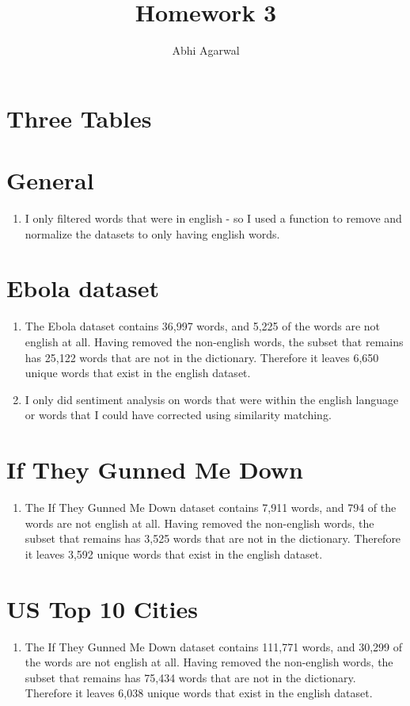 \documentclass[11pt, oneside]{article}
\title{Homework 3}
\author{Abhi Agarwal}
\date{}
\begin{document}
\maketitle

\section*{Three Tables}

\section*{General}

\begin{enumerate}
\item I only filtered words that were in english - so I used a function to remove and normalize the datasets to only having english words.
\end{enumerate}

\section*{Ebola dataset}

\begin{enumerate}
\item The Ebola dataset contains 36,997 words, and 5,225 of the words are not english at all. Having removed the non-english words, the subset that remains has 25,122 words that are not in the dictionary. Therefore it leaves 6,650 unique words that exist in the english dataset. 
\item I only did sentiment analysis on words that were within the english language or words that I could have corrected using similarity matching. 
\end{enumerate}

\section*{If They Gunned Me Down}

\begin{enumerate}
\item The If They Gunned Me Down dataset contains 7,911 words, and 794 of the words are not english at all. Having removed the non-english words, the subset that remains has 3,525 words that are not in the dictionary. Therefore it leaves 3,592 unique words that exist in the english dataset. 
\end{enumerate}

\section*{US Top 10 Cities}

\begin{enumerate}
\item The If They Gunned Me Down dataset contains 111,771 words, and 30,299 of the words are not english at all. Having removed the non-english words, the subset that remains has 75,434 words that are not in the dictionary. Therefore it leaves 6,038 unique words that exist in the english dataset. 
\end{enumerate}
\end{document}
